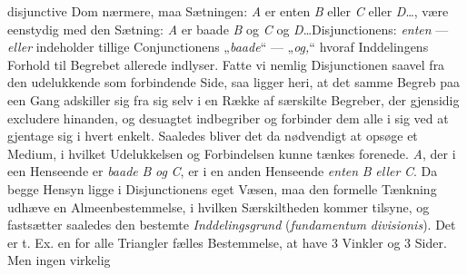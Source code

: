 \documentclass[12pt]{book}
\newcommand{\opage}[1]{\marginnote{\footnotesize\textit{[#1]}}}
\begin{document}
disjunctive Dom nærmere, maa Sætningen: \textit{A} er enten \textit{B} eller
\textit{C} eller \textit{D}\ldots, være eenstydig med den Sætning: \textit{A} er
baade \textit{B} og \textit{C} og \textit{D}\ldots Disjunctionens: \emph{enten}
--- \emph{eller} indeholder tillige Conjunctionens „\emph{baade}“ ---
„\emph{og,}“ hvoraf Inddelingens Forhold til Begrebet allerede indlyser. Fatte vi
nemlig Disjunctionen saavel fra den udelukkende som forbindende Side, saa ligger
heri, at det samme Begreb paa een Gang adskiller sig fra sig selv i en Række af
særskilte Begreber, der gjensidig excludere hinanden, og desuagtet indbegriber og
forbinder dem alle i sig ved at gjentage sig i hvert enkelt. Saaledes bliver det
da nødvendigt at opsøge et Medium, i hvilket Udelukkelsen og Forbindelsen kunne
tænkes forenede. \textit{A}, der i een Henseende er \emph{baade} \textit{B}
\emph{og} \textit{C}, er i en anden Henseende \emph{enten} \textit{B}
\emph{eller} \textit{C}. Da begge Hensyn ligge i Disjunctionens eget Væsen, maa
den formelle Tænkning udhæve en Almeenbestemmelse, i hvilken Særskiltheden kommer
tilsyne, og fastsætter saaledes den bestemte
\opage{66} %
\emph{Inddelingsgrund} (\textit{fundamentum divisionis}). Det er t. Ex. en for alle
Triangler fælles Bestemmelse, at have 3 Vinkler og 3 Sider. Men ingen virkelig
\end{document}
